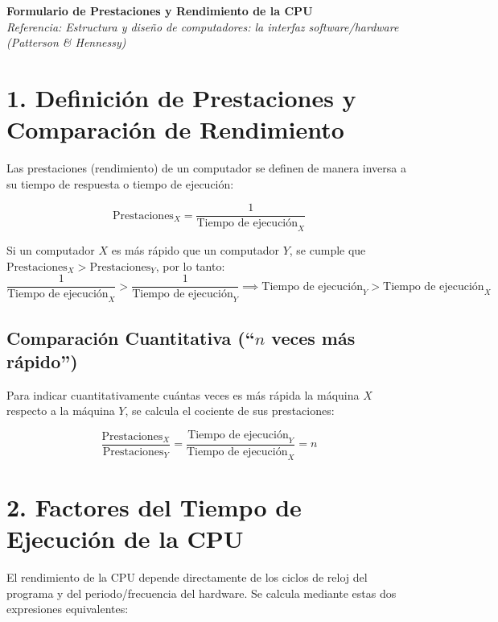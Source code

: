 \documentclass[11pt, letterpaper]{article}
\begin{document}
\begin{center}
    \Large\textbf{Formulario de Prestaciones y Rendimiento de la CPU} \\
    \vskip 0.2cm
    \small \textit{Referencia: Estructura y diseño de computadores: la interfaz software/hardware (Patterson \& Hennessy)}
\end{center}

\section{1. Definición de Prestaciones y Comparación de Rendimiento}

Las prestaciones (rendimiento) de un computador se definen de manera inversa a su tiempo de respuesta o tiempo de ejecución:

\begin{tcolorbox}[title=Relación Fundamental entre Prestaciones y Tiempo]
$$\text{Prestaciones}_X = \frac{1}{\text{Tiempo de ejecución}_X}$$
\end{tcolorbox}

Si un computador $X$ es más rápido que un computador $Y$, se cumple que $\text{Prestaciones}_X > \text{Prestaciones}_Y$, por lo tanto:
$$\frac{1}{\text{Tiempo de ejecución}_X} > \frac{1}{\text{Tiempo de ejecución}_Y} \implies \text{Tiempo de ejecución}_Y > \text{Tiempo de ejecución}_X$$

\subsection*{Comparación Cuantitativa (``$n$ veces más rápido'')}
Para indicar cuantitativamente cuántas veces es más rápida la máquina $X$ respecto a la máquina $Y$, se calcula el cociente de sus prestaciones:

\begin{tcolorbox}
$$\frac{\text{Prestaciones}_X}{\text{Prestaciones}_Y} = \frac{\text{Tiempo de ejecución}_Y}{\text{Tiempo de ejecución}_X} = n$$
\end{tcolorbox}

\section{2. Factores del Tiempo de Ejecución de la CPU}

El rendimiento de la CPU depende directamente de los ciclos de reloj del programa y del periodo/frecuencia del hardware. Se calcula mediante estas dos expresiones equivalentes:
\end{document}
